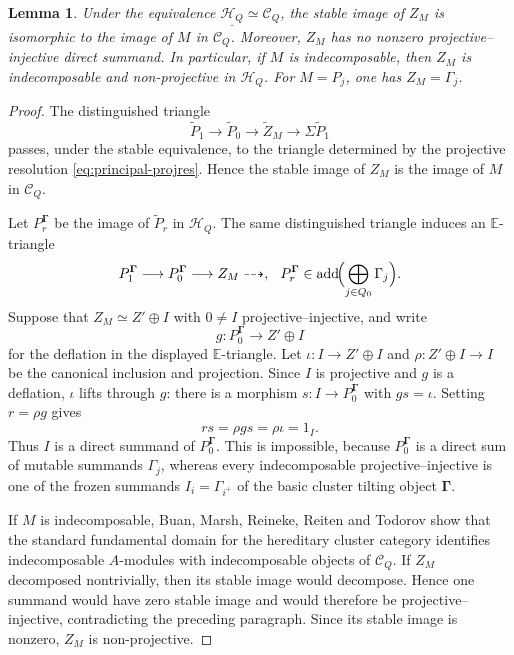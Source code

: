 \documentclass[11pt,reqno]{article}
\numberwithin{equation}{section}
\newtheorem{lemma}[lemma]{Lemma}
\theoremstyle{definition}
\DeclareMathOperator{\add}{add}
\newcommand{\E}{\mathbb E}
\begin{document}
\begin{lemma}\label{lem:principal-lift-minimal}
Under the equivalence $\underline{\mathcal H_Q}\simeq\mathcal C_Q$, the stable image of $Z_M$ is isomorphic to the image of $M$ in $\mathcal C_Q$.  Moreover, $Z_M$ has no nonzero projective--injective direct summand.  In particular, if $M$ is indecomposable, then $Z_M$ is indecomposable and non-projective in $\mathcal H_Q$. For $M=P_j$, one has $Z_M=\Gamma_j$.
\end{lemma}
\begin{proof}
The distinguished triangle
\[
 \widetilde P_1\longrightarrow\widetilde P_0\longrightarrow
 \widetilde Z_M\longrightarrow\Sigma\widetilde P_1
\]
passes, under the stable equivalence, to the triangle determined by the projective resolution \eqref{eq:principal-projres}.  Hence the stable image of $Z_M$ is the image of $M$ in $\mathcal C_Q$.

Let $P_r^{\boldsymbol\Gamma}$ be the image of $\widetilde P_r$ in $\mathcal H_Q$.  The same distinguished triangle induces an $\E$-triangle
\[
 P_1^{\boldsymbol\Gamma}\longrightarrow P_0^{\boldsymbol\Gamma}
 \longrightarrow Z_M\dashrightarrow,
 \hspace{2.5mm}
 P_r^{\boldsymbol\Gamma}\in\add\!\Bigl(\bigoplus_{j\in Q_0}\Gamma_j\Bigr).
\]
Suppose that $Z_M\simeq Z'\oplus I$ with $0\ne I$ projective--injective, and write
\[
 g\colon P_0^{\boldsymbol\Gamma}\longrightarrow Z'\oplus I
\]
for the deflation in the displayed $\E$-triangle.  Let $\iota\colon I\to Z'\oplus I$ and $\rho\colon Z'\oplus I\to I$ be the canonical inclusion and projection.  Since $I$ is projective and $g$ is a deflation, $\iota$ lifts through $g$: there is a morphism $s\colon I\to P_0^{\boldsymbol\Gamma}$ with $gs=\iota$.  Setting $r=\rho g$ gives
\[
 rs=\rho gs=\rho\iota=1_I.
\]
Thus $I$ is a direct summand of $P_0^{\boldsymbol\Gamma}$.  This is impossible, because $P_0^{\boldsymbol\Gamma}$ is a direct sum of mutable summands $\Gamma_j$, whereas every indecomposable projective--injective is one of the frozen summands $I_i=\Gamma_{i^+}$ of the basic cluster tilting object $\boldsymbol\Gamma$.

If $M$ is indecomposable, Buan, Marsh, Reineke, Reiten and Todorov \cite{BMRRT} show that the standard fundamental domain for the hereditary cluster category identifies indecomposable $A$-modules with indecomposable objects of $\mathcal C_Q$.  If $Z_M$ decomposed nontrivially, then its stable image would decompose. Hence one summand would have zero stable image and would therefore be projective--injective, contradicting the preceding paragraph.  Since its stable image is nonzero, $Z_M$ is non-projective.
\end{proof}
\end{document}
